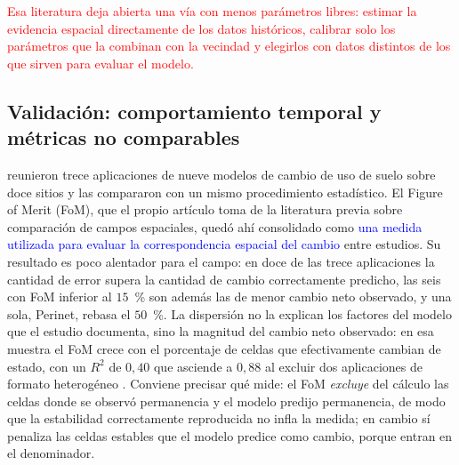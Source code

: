 \textcolor{red}{Esa literatura deja abierta una vía con menos parámetros
libres: estimar la evidencia espacial directamente de los datos históricos,
calibrar solo los parámetros que la combinan con la vecindad y elegirlos con
datos distintos de los que sirven para evaluar el modelo.}


%


\subsection{Validación: comportamiento temporal y métricas no comparables}

\textcite{pontius2008comparing} reunieron trece aplicaciones de nueve modelos
de cambio de uso de suelo sobre doce sitios y las compararon con un mismo
procedimiento estadístico. El Figure of Merit (FoM), que el propio artículo
toma de la literatura previa sobre comparación de campos espaciales, quedó
ahí consolidado como \textcolor{blue}{una medida utilizada para evaluar la
correspondencia espacial del cambio} entre estudios. Su resultado es poco
alentador para el campo: en doce de las trece aplicaciones la cantidad de error
supera la cantidad de cambio correctamente predicho, las seis con FoM inferior
al $15$~\% son además las de menor cambio neto observado, y una sola,
Perinet, rebasa el $50$~\%. La dispersión no la explican los factores del
modelo que el estudio documenta, sino la magnitud del cambio neto observado:
en esa muestra el FoM crece con el porcentaje de celdas que efectivamente
cambian de estado, con un $R^2$ de $0{,}40$ que asciende a $0{,}88$ al excluir
dos aplicaciones de formato heterogéneo \parencite{pontius2008comparing}.
Conviene precisar qué mide: el FoM \emph{excluye} del cálculo las celdas donde
se observó permanencia y el modelo predijo permanencia, de modo que la
estabilidad correctamente reproducida no infla la medida; en cambio sí
penaliza las celdas estables que el modelo predice como cambio, porque entran
en el denominador.

